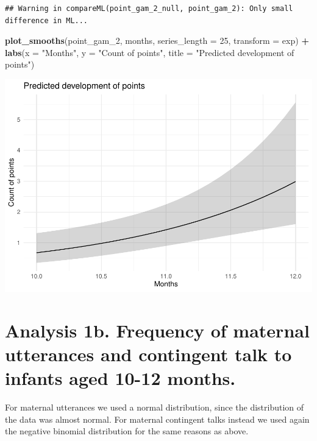 \documentclass[]{article}
\newenvironment{Shaded}{\begin{snugshade}}{\end{snugshade}}
\newcommand{\DataTypeTok}[1]{\textcolor[rgb]{0.13,0.29,0.53}{#1}}
\newcommand{\DecValTok}[1]{\textcolor[rgb]{0.00,0.00,0.81}{#1}}
\newcommand{\KeywordTok}[1]{\textcolor[rgb]{0.13,0.29,0.53}{\textbf{#1}}}
\newcommand{\NormalTok}[1]{#1}
\newcommand{\OperatorTok}[1]{\textcolor[rgb]{0.81,0.36,0.00}{\textbf{#1}}}
\newcommand{\StringTok}[1]{\textcolor[rgb]{0.31,0.60,0.02}{#1}}
\begin{document}
\begin{verbatim}
## Warning in compareML(point_gam_2_null, point_gam_2): Only small difference in ML...
\end{verbatim}

\begin{Shaded}
\begin{Highlighting}[]
\KeywordTok{plot_smooths}\NormalTok{(point_gam_}\DecValTok{2}\NormalTok{, months, }\DataTypeTok{series_length =} \DecValTok{25}\NormalTok{, }\DataTypeTok{transform =}\NormalTok{ exp) }\OperatorTok{+}
\StringTok{  }\KeywordTok{labs}\NormalTok{(}\DataTypeTok{x =} \StringTok{"Months"}\NormalTok{, }\DataTypeTok{y =} \StringTok{"Count of points"}\NormalTok{, }\DataTypeTok{title =} \StringTok{"Predicted development of points"}\NormalTok{)}
\end{Highlighting}
\end{Shaded}

\includegraphics{supplement_files/figure-latex/point-gam-2-plot-1.pdf}

\newpage

\hypertarget{analysis-1b.-frequency-of-maternal-utterances-and-contingent-talk-to-infants-aged-10-12-months.}{%
\section{Analysis 1b. Frequency of maternal utterances and contingent
talk to infants aged 10-12
months.}\label{analysis-1b.-frequency-of-maternal-utterances-and-contingent-talk-to-infants-aged-10-12-months.}}

For maternal utterances we used a normal distribution, since the
distribution of the data was almost normal. For maternal contingent
talks instead we used again the negative binomial distribution for the
same reasons as above.
\end{document}
